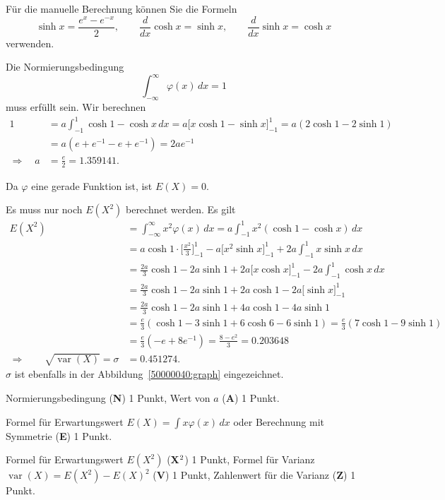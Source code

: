 \begin{hinweis}
Für die manuelle Berechnung können Sie die Formeln
\[
\sinh x = \frac{e^x - e^{-x}}2,\qquad
\frac{d}{dx}\cosh x = \sinh x, \qquad
\frac{d}{dx}\sinh x = \cosh x
\]
verwenden.
\end{hinweis}

\begin{loesung}
\begin{teilaufgaben}
\item
Die Normierungsbedingung
\[
\int_{-\infty}^\infty \varphi(x)\,dx =1
\]
muss erfüllt sein.
Wir berechnen
\begin{align*}
1
&=
a\int_{-1}^1 \cosh 1 - \cosh x\,dx
=
a\biggl[ x \cosh 1 - \sinh x\biggr]_{-1}^1
=
a(2\cosh1 -2\sinh 1)
\\
&=
a(e + e^{-1} - e + e^{-1})
=
2ae^{-1}
\\
\Rightarrow\quad
a&=\frac{e}{2}=1.359141.
\end{align*}
\item
Da $\varphi$ eine gerade Funktion ist, ist $E(X)=0$.
\item
Es muss nur noch $E(X^2)$ berechnet werden.
Es gilt
\begin{align*}
E(X^2)
&=
\int_{-\infty}^\infty x^2\varphi(x)\,dx
=
a\int_{-1}^1 x^2 (\cosh 1 - \cosh x)\,dx
\\
&=
a\cosh 1\cdot \biggl[\frac{x^2}{3}\biggr]_{-1}^1
-
a\biggl[x^2\sinh x\biggr]_{-1}^{1}
+
2a\int_{-1}^1 x\sinh x\,dx
\\
&=
\frac{2a}{3}\cosh 1 - 2a\sinh 1
+2a\biggl[x\cosh x\biggr]_{-1}^1
-2a\int_{-1}^1 \cosh x\,dx
\\
&=
\frac{2a}{3}\cosh 1
 - 2a\sinh 1
+2a\cosh 1
-2a\biggl[\sinh x\biggr]_{-1}^1
\\
&=
\frac{2a}{3}\cosh 1
 - 2a\sinh 1
+4a\cosh 1
-4a\sinh 1
\\
&=
\frac{e}{3}
(\cosh 1 -3\sinh 1 + 6\cosh 6 - 6\sinh 1)
=
\frac{e}{3}(7\cosh 1 - 9 \sinh 1)
\\
&=
\frac{e}{3}(-e+8e^{-1})
=
\frac{8-e^2}{3}
=
0.203648
\\
\Rightarrow\qquad
\sqrt{\operatorname{var}(X)}
=
\sigma
&=
0.451274.
\end{align*}
$\sigma$ ist ebenfalls in der Abbildung~\ref{50000040:graph} eingezeichnet.
\qedhere
\end{teilaufgaben}
\end{loesung}

\begin{bewertung}
\begin{teilaufgaben}
\item
Normierungsbedingung ({\bf N}) 1 Punkt,
Wert von $a$ ({\bf A}) 1 Punkt.
\item
Formel für Erwartungswert $E(X)=\int x\varphi(x)\,dx$
oder Berechnung mit Symmetrie ({\bf E}) 1 Punkt.
\item
Formel für Erwartungswert $E(X^2)$  ({\bf X$\mathstrut^2$}) 1 Punkt,
Formel für Varianz $\operatorname{var}(X) = E(X^2)-E(X)^2$ ({\bf V}) 1 Punkt,
Zahlenwert für die Varianz ({\bf Z}) 1 Punkt.
\end{teilaufgaben}
\end{bewertung}

